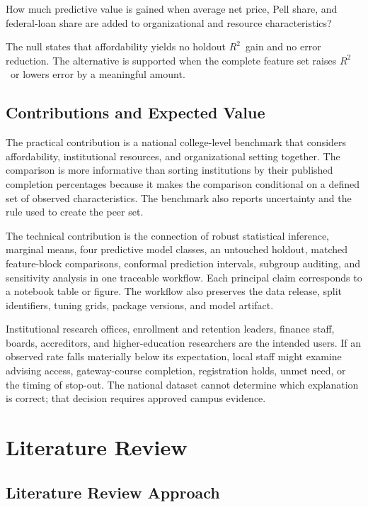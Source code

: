 \documentclass[12pt,a4paper]{article}
\newcommand{\Rtwo}{\ensuremath{R^{2}}}
\begin{document}
How much predictive value is gained when average net price, Pell share, and federal-loan share are added to organizational and resource characteristics?

The null states that affordability yields no holdout \Rtwo\ gain and no error reduction. The alternative is supported when the complete feature set raises \Rtwo\ or lowers error by a meaningful amount.

\subsection{Contributions and Expected Value}

The practical contribution is a national college-level benchmark that considers affordability, institutional resources, and organizational setting together. The comparison is more informative than sorting institutions by their published completion percentages because it makes the comparison conditional on a defined set of observed characteristics. The benchmark also reports uncertainty and the rule used to create the peer set.

The technical contribution is the connection of robust statistical inference, marginal means, four predictive model classes, an untouched holdout, matched feature-block comparisons, conformal prediction intervals, subgroup auditing, and sensitivity analysis in one traceable workflow. Each principal claim corresponds to a notebook table or figure. The workflow also preserves the data release, split identifiers, tuning grids, package versions, and model artifact.

Institutional research offices, enrollment and retention leaders, finance staff, boards, accreditors, and higher-education researchers are the intended users. If an observed rate falls materially below its expectation, local staff might examine advising access, gateway-course completion, registration holds, unmet need, or the timing of stop-out. The national dataset cannot determine which explanation is correct; that decision requires approved campus evidence.

\section{Literature Review}

\subsection{Literature Review Approach}
\end{document}
